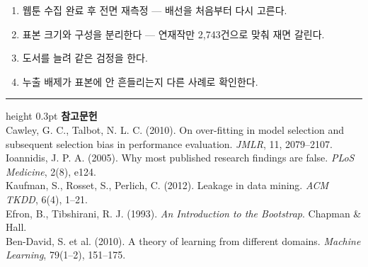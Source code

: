 \documentclass[10pt]{article}
\begin{document}
\begin{enumerate}[leftmargin=1.3em,itemsep=0.15em]
\item 웹툰 수집 완료 후 전면 재측정 --- 배선을 처음부터 다시 고른다.
\item 표본 크기와 구성을 분리한다 --- 연재작만 2,743건으로 맞춰 재면 갈린다.
\item 도서를 늘려 같은 검정을 한다.
\item 누출 배제가 표본에 안 흔들리는지 다른 사례로 확인한다.
\end{enumerate}

\vspace{0.6em}
\hrule height 0.3pt
\vspace{0.5em}
{\footnotesize
\textbf{참고문헌}\\[0.3em]
Cawley, G. C., Talbot, N. L. C. (2010). On over-fitting in model selection and
subsequent selection bias in performance evaluation. \emph{JMLR}, 11, 2079--2107.\\[0.15em]
Ioannidis, J. P. A. (2005). Why most published research findings are false.
\emph{PLoS Medicine}, 2(8), e124.\\[0.15em]
Kaufman, S., Rosset, S., Perlich, C. (2012). Leakage in data mining.
\emph{ACM TKDD}, 6(4), 1--21.\\[0.15em]
Efron, B., Tibshirani, R. J. (1993). \emph{An Introduction to the Bootstrap}.
Chapman \& Hall.\\[0.15em]
Ben-David, S. et al. (2010). A theory of learning from different domains.
\emph{Machine Learning}, 79(1--2), 151--175.
}
\end{document}
